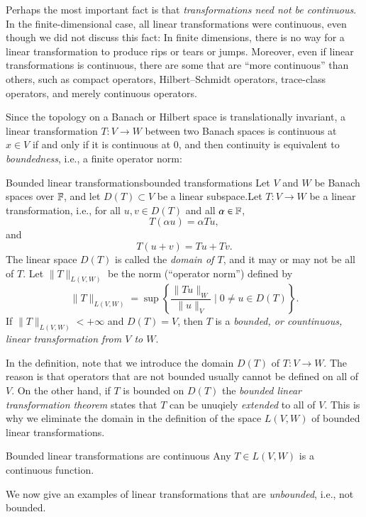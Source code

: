 Perhaps the most important fact is that \emph{transformations need not be continuous}. In the finite-dimensional case, all linear transformations were continuous, even though we did not discuss this fact: In finite dimensions, there is no way for a linear transformation to produce rips or tears or jumps. Moreover, even if linear transformations is continuous, there are some  that are ``more continuous'' than others, such as compact operators, Hilbert--Schmidt operators, trace-class operators, and merely continuous operators.

Since the topology on a Banach or Hilbert space is translationally invariant, a linear transformation $T: V \to W$ between two Banach spaces is continuous at $x \in V$ if and only if it is continuous at $0$, and then continuity is equivalent to \emph{boundedness}, i.e., a finite operator norm:
\begin{myDefinition}{Bounded linear transformations}{bounded transformations}
    Let $V$ and $W$ be Banach spaces over $\mathbb{F}$, and let $D(T) \subset V$ be a linear subspace.Let $T : V \to W$ be a linear transformation, i.e., for all $u,v \in D(T)$ and all $\alpha \in \mathbb{F}$,
    $$ T(\alpha u) = \alpha Tu, $$
    and
    $$ T(u + v) = Tu + Tv. $$
    The linear space $D(T)$ is called the \emph{domain of $T$}, and it may or may not be all of $T$.
    Let $\|T\|_{L(V,W)}$ be the norm (``operator norm'') defined by
    \begin{equation}
        \|T\|_{L(V,W)} = \sup \left\{ \frac{\|T u\|_W}{\|u\|_V} \mid 0 \neq u \in D(T) \right\}.
    \end{equation}
    If $\|T\|_{L(V,W)}< +\infty$ and $D(T) = V$, then $T$ is a \emph{bounded, or countinuous, linear transformation from $V$ to $W$}.
\end{myDefinition}
In the definition, note that we introduce the domain $D(T)$ of $T : V \to W$. The reason is that operators that are not bounded usually cannot be defined on all of $V$. On the other hand, if $T$ is bounded on $D(T)$ the \emph{bounded linear transformation theorem} states that $T$ can be unuqiely \emph{extended} to all of $V$. This is why we eliminate the domain in the definition of the space $L(V,W)$ of bounded linear transformations.

\begin{myTheorem}{Bounded linear transformations are continuous}{}
    Any $T \in L(V,W)$ is a continuous function.    
\end{myTheorem}


We now give an examples of linear transformations that are \emph{unbounded}, i.e., not bounded.


